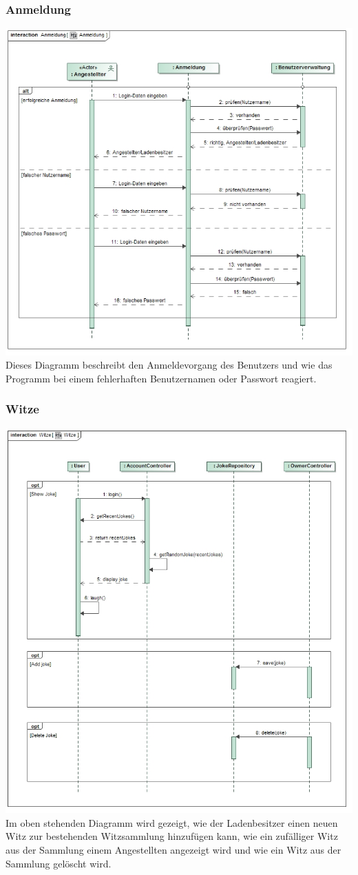 \documentclass[pdftex,12pt,a4paper]{article}
\begin{document}
\subsubsection*{Anmeldung}
\includegraphics[width=1\textwidth]{../Pflichtenheft/images/anmeldung}
Dieses Diagramm beschreibt den Anmeldevorgang des Benutzers und wie das Programm bei einem fehlerhaften Benutzernamen oder Passwort reagiert.
\subsubsection*{Witze}
\includegraphics[width=1\textwidth]{../../Entwurf/witze_ood}
Im oben stehenden Diagramm wird gezeigt, wie der Ladenbesitzer einen neuen Witz zur bestehenden Witzsammlung hinzufügen kann, wie ein zufälliger Witz aus der Sammlung einem Angestellten angezeigt wird und wie ein Witz aus der Sammlung gelöscht wird.
\end{document}
